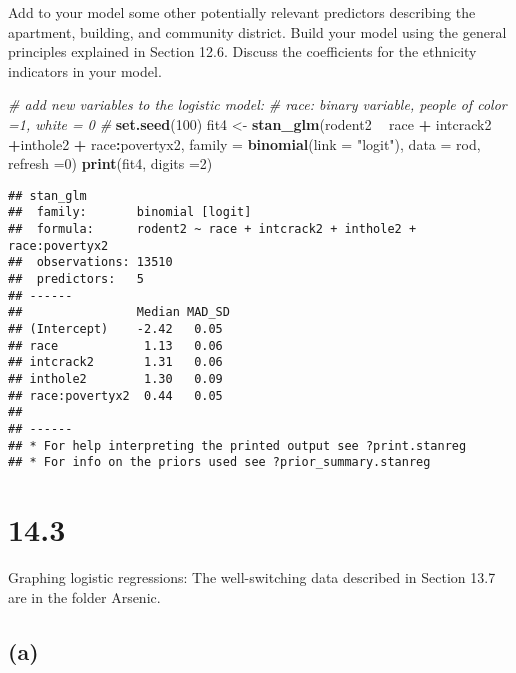 \documentclass[
]{article}
\newenvironment{Shaded}{\begin{snugshade}}{\end{snugshade}}
\newcommand{\CommentTok}[1]{\textcolor[rgb]{0.56,0.35,0.01}{\textit{#1}}}
\newcommand{\DataTypeTok}[1]{\textcolor[rgb]{0.13,0.29,0.53}{#1}}
\newcommand{\DecValTok}[1]{\textcolor[rgb]{0.00,0.00,0.81}{#1}}
\newcommand{\KeywordTok}[1]{\textcolor[rgb]{0.13,0.29,0.53}{\textbf{#1}}}
\newcommand{\NormalTok}[1]{#1}
\newcommand{\OperatorTok}[1]{\textcolor[rgb]{0.81,0.36,0.00}{\textbf{#1}}}
\newcommand{\StringTok}[1]{\textcolor[rgb]{0.31,0.60,0.02}{#1}}
\begin{document}
Add to your model some other potentially relevant predictors describing
the apartment, building, and community district. Build your model using
the general principles explained in Section 12.6. Discuss the
coefficients for the ethnicity indicators in your model.

\begin{Shaded}
\begin{Highlighting}[]
\CommentTok{# add new variables to the logistic model: }
 \CommentTok{# race: binary variable, people of color =1, white = 0}
 \CommentTok{# }
\KeywordTok{set.seed}\NormalTok{(}\DecValTok{100}\NormalTok{)}
\NormalTok{fit4 <-}\StringTok{ }\KeywordTok{stan_glm}\NormalTok{(rodent2 }\OperatorTok{~}\StringTok{ }\NormalTok{race }\OperatorTok{+}\StringTok{ }\NormalTok{intcrack2 }\OperatorTok{+}\NormalTok{inthole2 }\OperatorTok{+}\StringTok{ }\NormalTok{race}\OperatorTok{:}\NormalTok{povertyx2, }\DataTypeTok{family =} \KeywordTok{binomial}\NormalTok{(}\DataTypeTok{link =} \StringTok{"logit"}\NormalTok{), }\DataTypeTok{data =}\NormalTok{ rod, }\DataTypeTok{refresh =}\DecValTok{0}\NormalTok{)}
\KeywordTok{print}\NormalTok{(fit4, }\DataTypeTok{digits =}\DecValTok{2}\NormalTok{)}
\end{Highlighting}
\end{Shaded}

\begin{verbatim}
## stan_glm
##  family:       binomial [logit]
##  formula:      rodent2 ~ race + intcrack2 + inthole2 + race:povertyx2
##  observations: 13510
##  predictors:   5
## ------
##                Median MAD_SD
## (Intercept)    -2.42   0.05 
## race            1.13   0.06 
## intcrack2       1.31   0.06 
## inthole2        1.30   0.09 
## race:povertyx2  0.44   0.05 
## 
## ------
## * For help interpreting the printed output see ?print.stanreg
## * For info on the priors used see ?prior_summary.stanreg
\end{verbatim}

\hypertarget{section-5}{%
\section{14.3}\label{section-5}}

Graphing logistic regressions: The well-switching data described in
Section 13.7 are in the folder Arsenic.

\hypertarget{a-4}{%
\subsection{(a)}\label{a-4}}
\end{document}
